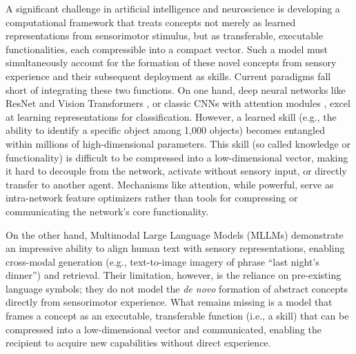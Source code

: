 \documentclass[pdflatex,sn-mathphys-num,lineno]{sn-jnl}%
\begin{document}
\begin{CJK}{UTF8}{gbsn}
A significant challenge in artificial intelligence and neuroscience is developing a computational framework that treats concepts not merely as learned representations from sensorimotor stimulus, but as transferable, executable functionalities, each compressible into a compact vector. Such a model must simultaneously account for the formation of these novel concepts from sensory experience and their subsequent deployment as skills. Current paradigms fall short of integrating these two functions. On one hand, deep neural networks like ResNet and Vision Transformers \cite{he_deep_2016,dosovitskiy_image_2021}, or classic CNNs with attention modules \cite{hu_squeeze-and-excitation_2018,woo_cbam_2018}, excel at learning representations for classification. However, a learned skill (e.g., the ability to identify a specific object among 1,000 objects) becomes entangled within millions of high-dimensional parameters. This skill (so called knowledge or functionality) is difficult to be compressed into a low-dimensional vector, making it hard to decouple from the network, activate without sensory input, or directly transfer to another agent. Mechanisms like attention, while powerful, serve as intra-network feature optimizers rather than tools for compressing or communicating the network's core functionality.

On the other hand, Multimodal Large Language Models (MLLMs) \cite{radford_learning_2021,li_blip-2_2023,wu_deepseek-vl2_2024} demonstrate an impressive ability to align human text with sensory representations, enabling cross-modal generation (e.g., text-to-image imagery of phrase “last night’s dinner”) and retrieval. Their limitation, however, is the reliance on pre-existing language symbols; they do not model the \textit{de novo} formation of abstract concepts directly from sensorimotor experience. What remains missing is a model that frames a concept as an executable, transferable function (i.e., a skill) that can be compressed into a low-dimensional vector and communicated, enabling the recipient to acquire new capabilities without direct experience.



\end{CJK}
\end{document}
